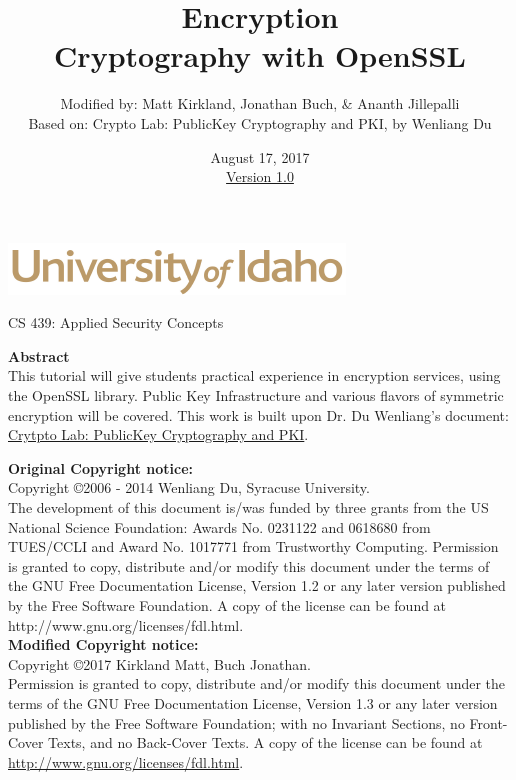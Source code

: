 \documentclass[12pt]{extarticle}
\begin{document}
\title{ Encryption \\ \large Cryptography with OpenSSL }
\author{ Modified by: Matt Kirkland, Jonathan Buch, \& Ananth Jillepalli\\
Based on: Crypto Lab: Public\-Key Cryptography and PKI, by Wenliang Du}
\date{August 17, 2017 \\ \hyperref[changelog]{Version 1.0}} %
\renewcommand{\abstractname}{Summary}
\begin{titlepage}
\maketitle
{}
\begin{center}
\includegraphics[scale=.5]{UofI}

\large{CS 439: Applied Security Concepts}

\vskip 10pt
\textbf{Abstract}\\
This tutorial will give students practical experience in encryption services, using the OpenSSL library. Public Key Infrastructure and various flavors of symmetric encryption will be covered. This work is built upon Dr. Du Wenliang's document:  \href{http://www.cis.syr.edu/~wedu/seed/Labs_12.04/Crypto/Crypto_PublicKey/Crypto_PublicKey.pdf}{Crytpto Lab: Public\-Key Cryptography and PKI}.

\end{center}

\vfill

\noindent
\begin{center}
\textbf{Original Copyright notice:} \\
Copyright \copyright 2006 - 2014 Wenliang Du, Syracuse University.\\
The development of this document is/was funded by three grants from the US National Science Foundation:
Awards No. 0231122 and 0618680 from TUES/CCLI and Award No. 1017771 from Trustworthy Computing.
Permission is granted to copy, distribute and/or modify this document under the terms of the GNU Free
Documentation License, Version 1.2 or any later version published by the Free Software Foundation. A copy
of the license can be found at http://www.gnu.org/licenses/fdl.html.\\
\vspace*{5mm}
\textbf{Modified Copyright notice:} \\
Copyright \copyright 2017  Kirkland Matt, Buch Jonathan.\\
Permission is granted to copy, distribute and/or modify this document under the terms of the GNU Free Documentation License, Version 1.3 or any later version published by the Free Software Foundation; with no Invariant Sections, no Front-Cover Texts, and no Back-Cover Texts. A copy of the license can be found at \href{http://www.gnu.org/licenses/fdl.html}{http://www.gnu.org/licenses/fdl.html}.\\
\end{center}

\end{titlepage}
\end{document}
